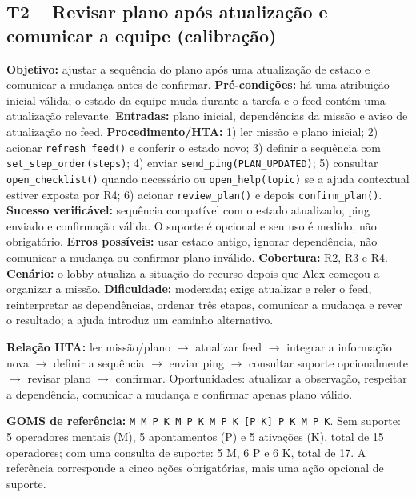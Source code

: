 \documentclass[conference]{IEEEtran}
\begin{document}
\subsection{T2 -- Revisar plano após atualização e comunicar a equipe (calibração)}
\textbf{Objetivo:} ajustar a sequência do plano após uma atualização de estado e comunicar a mudança antes de confirmar. \textbf{Pré-condições:} há uma atribuição inicial válida; o estado da equipe muda durante a tarefa e o feed contém uma atualização relevante. \textbf{Entradas:} plano inicial, dependências da missão e aviso de atualização no feed. \textbf{Procedimento/HTA:} 1) ler missão e plano inicial; 2) acionar \texttt{refresh\_feed()} e conferir o estado novo; 3) definir a sequência com \texttt{set\_step\_order(steps)}; 4) enviar \texttt{send\_ping(PLAN\_UPDATED)}; 5) consultar \texttt{open\_checklist()} quando necessário ou \texttt{open\_help(topic)} se a ajuda contextual estiver exposta por R4; 6) acionar \texttt{review\_plan()} e depois \texttt{confirm\_plan()}. \textbf{Sucesso verificável:} sequência compatível com o estado atualizado, ping enviado e confirmação válida. O suporte é opcional e seu uso é medido, não obrigatório. \textbf{Erros possíveis:} usar estado antigo, ignorar dependência, não comunicar a mudança ou confirmar plano inválido. \textbf{Cobertura:} R2, R3 e R4. \textbf{Cenário:} o lobby atualiza a situação do recurso depois que Alex começou a organizar a missão. \textbf{Dificuldade:} moderada; exige atualizar e reler o feed, reinterpretar as dependências, ordenar três etapas, comunicar a mudança e rever o resultado; a ajuda introduz um caminho alternativo.

\textbf{Relação HTA:} ler missão/plano $\rightarrow$ atualizar feed $\rightarrow$ integrar a informação nova $\rightarrow$ definir a sequência $\rightarrow$ enviar ping $\rightarrow$ consultar suporte opcionalmente $\rightarrow$ revisar plano $\rightarrow$ confirmar. Oportunidades: atualizar a observação, respeitar a dependência, comunicar a mudança e confirmar apenas plano válido.

\textbf{GOMS de referência:} \texttt{M M P K M P K M P K [P K] P K M P K}. Sem suporte: 5 operadores mentais (M), 5 apontamentos (P) e 5 ativações (K), total de 15 operadores; com uma consulta de suporte: 5 M, 6 P e 6 K, total de 17. A referência corresponde a cinco ações obrigatórias, mais uma ação opcional de suporte.
\end{document}
